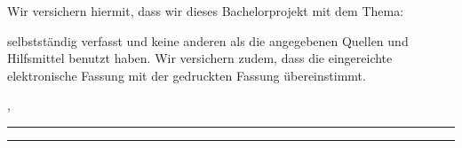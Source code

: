\thispagestyle{empty}
\vspace*{2em}

Wir versichern hiermit, dass wir dieses Bachelorprojekt mit dem Thema:
\begin{center}
    \vspace{2em}
    \bf\large\myTopic\rm
    \vspace{2em}
\end{center}
\noindent selbstständig verfasst und keine anderen als die angegebenen Quellen und Hilfsmittel benutzt haben. Wir versichern zudem, dass die eingereichte elektronische Fassung mit der gedruckten Fassung übereinstimmt.

\vspace{4em}

\noindent \myEndPlace, \myEndDate
\vspace{4em}

\noindent\rule{6cm}{0.4pt}\hfill\rule{6cm}{0.4pt}\\
\myAutor\hfill\myAutorTwo